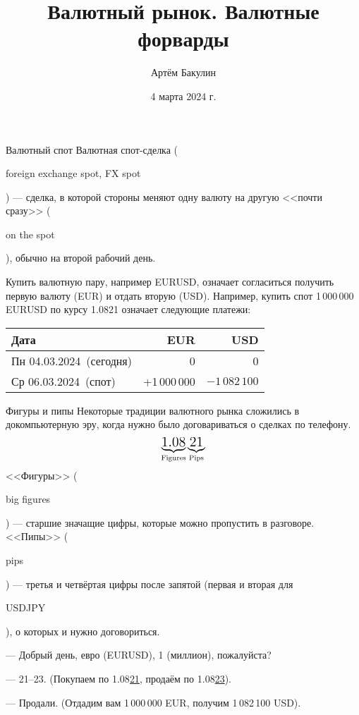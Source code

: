 \documentclass{beamer}
\title{Валютный рынок. Валютные форварды}
\author{Артём Бакулин}
\date{4 марта 2024 г.}
\newcommand{\en}[1]{\begin{otherlanguage}{english}#1\end{otherlanguage}}
\newcommand{\eurusdBigFigures}{1.08}
\newcommand{\eurusdBigFiguresPerMillion}{1\,08}
\newcommand{\eurusdBusinessDate}{Пн 04.03.2024}
\newcommand{\eurusdSpotDate}{Ср 06.03.2024}
\begin{document}
\begin{frame}
\titlepage
\end{frame}



\begin{frame}{Валютный спот}
\justify
\alert{Валютная спот-сделка} (\en{foreign exchange spot, FX spot}) --- сделка, в которой стороны меняют одну валюту на другую <<почти сразу>> (\en{on the spot}), обычно на второй рабочий день.

\justify
Купить валютную пару, например EURUSD, означает согласиться получить первую валюту (EUR) и отдать вторую (USD). Например, купить спот 1\,000\,000 EURUSD по курсу \eurusdBigFigures21 означает следующие платежи:

\justify
\centering
\begin{tabular}{l|r|r}
Дата                          & EUR & USD \\ \hline
\eurusdBusinessDate\ (сегодня)  & 0   & 0   \\
\eurusdSpotDate\ (спот)     & +1\,000\,000 & $-\eurusdBigFiguresPerMillion2\,100$
\end{tabular}
\end{frame}



\begin{frame}{Фигуры и пипы}
\justify
Некоторые традиции валютного рынка сложились в докомпьютерную эру, когда нужно
было договариваться о сделках по телефону.
\begin{align*}
\underbrace{\text{\Large \eurusdBigFigures}}_{\text{Figures}}\underbrace{\text{\Large 21}}_{\text{Pips}}
\end{align*}
\justify
<<Фигуры>> (\en{big figures}) ---  старшие значащие цифры, которые можно пропустить в 
разговоре. <<Пипы>> (\en{pips}) --- третья и четвёртая цифры после запятой (первая и вторая 
для \en{USDJPY}), о которых и нужно договориться.

\justify
--- Добрый день, евро (EURUSD), 1 (миллион), пожалуйста?

--- 21--23. (Покупаем по \eurusdBigFigures\underline{21}, продаём по \eurusdBigFigures\underline{23}).

--- Продали. (Отдадим вам 1\,000\,000 EUR, получим \eurusdBigFiguresPerMillion2\,100 USD).
\end{frame}
\end{document}
